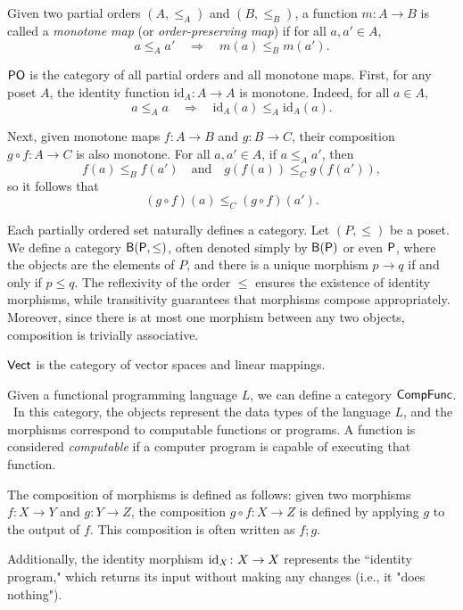 \begin{definition}
Given two partial orders \((A, \leq_A)\) and \((B,\leq_B)\), a function \(m: A \to B\) is called a \emph{monotone map} (or \emph{order-preserving map}) if for all \(a, a' \in A\),
\[
a \leq_A a' \quad \Rightarrow \quad m(a) \leq_B m(a').
\]
\end{definition}



\begin{example}
  $\mathsf{PO}$ is the category of all partial orders and all monotone maps. First, for any poset \(A\), the identity function \(\mathrm{id}_A : A \to A\) is monotone. Indeed, for all \(a \in A\),
\[
a \leq_A a \quad \Rightarrow \quad \mathrm{id}_A(a) \leq_A \mathrm{id}_A(a).
\]

Next, given monotone maps \(f : A \to B\) and \(g : B \to C\), their composition \(g \circ f : A \to C\) is also monotone. For all \(a, a' \in A\), if \(a \leq_A a'\), then
\[
f(a) \leq_B f(a') \quad \text{and} \quad g(f(a)) \leq_C g(f(a')),
\]
so it follows that
\[
(g \circ f)(a) \leq_C (g \circ f)(a').
\]

\end{example}

\begin{example}
  Each partially ordered set naturally defines a category. Let \( (P, \leq) \) be a poset. We define a category \( \mathsf{B(P, \leq)} \), often denoted simply by \( \mathsf{B(P)} \) or even \( \mathsf{P} \), where the objects are the elements of \( P \), and there is a unique morphism \( p \to q \) if and only if \( p \leq q \). The reflexivity of the order \( \leq \) ensures the existence of identity morphisms, while transitivity guarantees that morphisms compose appropriately. Moreover, since there is at most one morphism between any two objects, composition is trivially associative. 
\end{example}

\begin{example}
 $\mathsf{Vect}$ is the category of vector spaces and linear mappings.
\end{example}

\begin{example}
Given a functional programming language $L$, we can define a category $\mathsf{CompFunc}$.  In this category, the objects represent the data types of the language \( L \), and the morphisms correspond to computable functions or programs. A function is considered \emph{computable} if a computer program is capable of executing that function.

The composition of morphisms is defined as follows: given two morphisms \( f \colon X \to Y \) and \( g \colon Y \to Z \), the composition \( g \circ f \colon X \to Z \) is defined by applying \( g \) to the output of \( f \). This composition is often written as \( f;g \).

Additionally, the identity morphism \( \mathrm{id}_X \colon X \to X \) represents the ``identity program," which returns its input without making any changes (i.e., it "does nothing").
\end{example}


